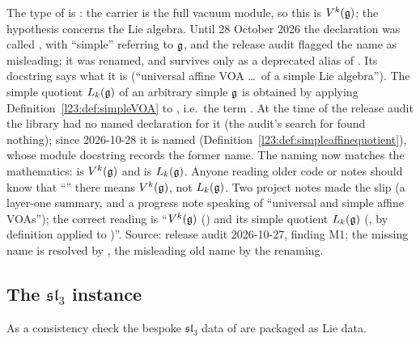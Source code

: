\begin{warning}[title={Naming: \texttt{universalAffineVOA} is $V^k(\mathfrak g)$, \texttt{simpleAffineQuotientVOA} is $L_k(\mathfrak g)$}]\label{l23:warn:simplename}
The type of  is : the carrier is the full vacuum
module, so this is $V^k(\mathfrak g)$; the hypothesis  concerns the Lie algebra. Until 28 October 2026 the
declaration was called , with ``simple'' referring to $\mathfrak g$, and the release audit flagged the name as
misleading; it was renamed, and  survives only as a deprecated alias of . Its docstring
says what it is (``universal affine VOA \dots\ of a simple Lie algebra''). The simple quotient $L_k(\mathfrak g)$ of an
arbitrary simple $\mathfrak g$ is obtained by applying Definition~\ref{l23:def:simpleVOA} to , i.e.\ the term
. At the time of the release audit the library had no named declaration for it (the
audit's search for  found nothing); since 2026-10-28 it is named 
(Definition~\ref{l23:def:simpleaffinequotient}), whose module docstring records the former name. The naming now matches the
mathematics:  is $V^k(\mathfrak g)$ and  is $L_k(\mathfrak g)$. Anyone reading older code or
notes should know that ``'' there means $V^k(\mathfrak g)$, not $L_k(\mathfrak g)$. Two project
notes made the slip (a layer-one summary, and a progress note speaking of ``universal and simple affine VOAs''); the
correct reading is ``$V^k(\mathfrak g)$ () and its simple quotient $L_k(\mathfrak g)$ (, by
definition  applied to )''. Source: release audit 2026-10-27, finding M1; the missing name is
resolved by , the misleading old name by the renaming.
\end{warning}

\subsection{The \texorpdfstring{$\mathfrak{sl}_3$}{sl(3)} instance}\label{l23:sec:sl3}

As a consistency check the bespoke $\mathfrak{sl}_3$ data of  are packaged as Lie data.

